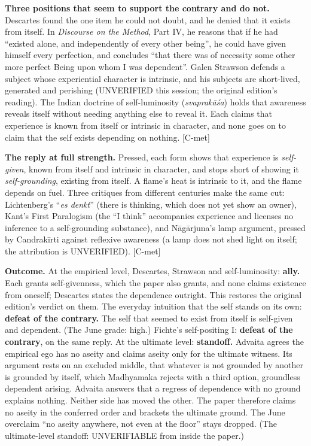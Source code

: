 \documentclass[11pt]{article}
\begin{document}
\textbf{Three positions that seem to support the contrary and do not.} Descartes found the one item he could not doubt, and he denied that it exists from itself. In \emph{Discourse on the Method}, Part IV, he reasons that if he had ``existed alone, and independently of every other being'', he could have given himself every perfection, and concludes ``that there was of necessity some other more perfect Being upon whom I was dependent''. Galen Strawson defends a subject whose experiential character is intrinsic, and his subjects are short-lived, generated and perishing (UNVERIFIED this session; the original edition's reading). The Indian doctrine of self-luminosity (\emph{svaprakāśa}) holds that awareness reveals itself without needing anything else to reveal it. Each claims that experience is known from itself or intrinsic in character, and none goes on to claim that the self exists depending on nothing. [C-met]

\textbf{The reply at full strength.} Pressed, each form shows that experience is \emph{self-given}, known from itself and intrinsic in character, and stops short of showing it \emph{self-grounding}, existing from itself. A flame's heat is intrinsic to it, and the flame depends on fuel. Three critiques from different centuries make the same cut: Lichtenberg's ``\emph{es denkt}'' (there is thinking, which does not yet show an owner), Kant's First Paralogism (the ``I think'' accompanies experience and licenses no inference to a self-grounding substance), and Nāgārjuna's lamp argument, pressed by Candrakīrti against reflexive awareness (a lamp does not shed light on itself; the attribution is UNVERIFIED). [C-met]

\textbf{Outcome.} At the empirical level, Descartes, Strawson and self-luminosity: \textbf{ally.} Each grants self-givenness, which the paper also grants, and none claims existence from oneself; Descartes states the dependence outright. This restores the original edition's verdict on them. The everyday intuition that the self stands on its own: \textbf{defeat of the contrary.} The self that seemed to exist from itself is self-given and dependent. (The June grade: high.) Fichte's self-positing I: \textbf{defeat of the contrary}, on the same reply. At the ultimate level: \textbf{standoff.} Advaita agrees the empirical ego has no aseity and claims aseity only for the ultimate witness. Its argument rests on an excluded middle, that whatever is not grounded by another is grounded by itself, which Madhyamaka rejects with a third option, groundless dependent arising. Advaita answers that a regress of dependence with no ground explains nothing. Neither side has moved the other. The paper therefore claims no aseity in the conferred order and brackets the ultimate ground. The June overclaim ``no aseity anywhere, not even at the floor'' stays dropped. (The ultimate-level standoff: UNVERIFIABLE from inside the paper.)
\end{document}
